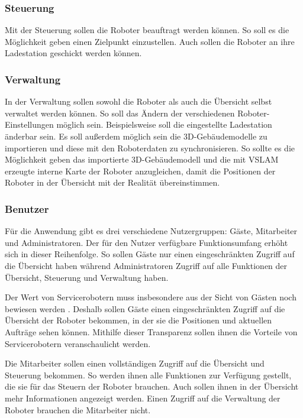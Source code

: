 \subsubsection{Steuerung}

Mit der Steuerung sollen die Roboter beauftragt werden können. So soll es die Möglichkeit geben einen Zielpunkt einzustellen. Auch sollen die Roboter an ihre Ladestation geschickt werden können.

\subsubsection{Verwaltung}

In der Verwaltung sollen sowohl die Roboter als auch die Übersicht selbst verwaltet werden können. So soll das Ändern der verschiedenen Roboter-Einstellungen möglich sein. Beispielsweise soll die eingestellte Ladestation änderbar sein. Es soll außerdem möglich sein die 3D-Gebäudemodelle zu importieren und diese mit den Roboterdaten zu synchronisieren. So sollte es die Möglichkeit geben das importierte 3D-Gebäudemodell und die mit \ac{VSLAM} erzeugte interne Karte der Roboter anzugleichen, damit die Positionen der Roboter in der Übersicht mit der Realität übereinstimmen.

\subsubsection{Benutzer}

Für die Anwendung gibt es drei verschiedene Nutzergruppen: Gäste, Mitarbeiter und Administratoren. Der für den Nutzer verfügbare Funktionsumfang erhöht sich in dieser Reihenfolge. So sollen Gäste nur einen eingeschränkten Zugriff auf die Übersicht haben während Administratoren Zugriff auf alle Funktionen der Übersicht, Steuerung und Verwaltung haben.

Der Wert von Servicerobotern muss insbesondere aus der Sicht von Gästen noch bewiesen werden \cite[S.~429]{Paluch2020}. Deshalb sollen Gäste einen eingeschränkten Zugriff auf die Übersicht der Roboter bekommen, in der sie die Positionen und aktuellen Aufträge sehen können. Mithilfe dieser Transparenz sollen ihnen die Vorteile von Servicerobotern veranschaulicht werden.

Die Mitarbeiter sollen einen vollständigen Zugriff auf die Übersicht und Steuerung bekommen. So werden ihnen alle Funktionen zur Verfügung gestellt, die sie für das Steuern der Roboter brauchen. Auch sollen ihnen in der Übersicht mehr Informationen angezeigt werden. Einen Zugriff auf die Verwaltung der Roboter brauchen die Mitarbeiter nicht.

